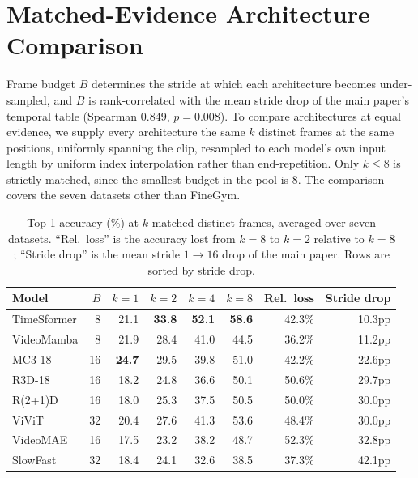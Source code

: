 \documentclass[a4paper, 10pt, conference, onecolumn]{ieeeconf}
\newcommand{\tabtight}{\setlength{\tabcolsep}{3.5pt}\renewcommand{\arraystretch}{1.12}}
\begin{document}
\section{Matched-Evidence Architecture Comparison}
\label{sec:sup_matched}

Frame budget $B$ determines the stride at which each architecture becomes
under-sampled, and $B$ is rank-correlated with the mean stride drop of the main
paper's temporal table (Spearman $0.849$, $p{=}0.008$). To compare architectures
at equal evidence, we supply every architecture the same $k$ distinct frames at
the same positions, uniformly spanning the clip, resampled to each model's own
input length by uniform index interpolation rather than end-repetition. Only
$k\leq8$ is strictly matched, since the smallest budget in the pool is 8. The
comparison covers the seven datasets other than FineGym.

\begin{table}[!htbp]
\centering
\caption{Top-1 accuracy (\%) at $k$ matched distinct frames, averaged over seven
datasets. ``Rel.\ loss'' is the accuracy lost from $k{=}8$ to $k{=}2$ relative
to $k{=}8$; ``Stride drop'' is the mean stride $1\to16$ drop of the main paper.
Rows are sorted by stride drop.}
\label{tab:sup_matched}
\scriptsize\tabtight
\begin{tabular}{l r rrrr r r}
\toprule
Model & $B$ & $k{=}1$ & $k{=}2$ & $k{=}4$ & $k{=}8$ & Rel.\ loss & Stride drop \\
\midrule
TimeSformer &  8 & 21.1 & \textbf{33.8} & \textbf{52.1} & \textbf{58.6} & 42.3\% & 10.3pp \\
VideoMamba  &  8 & 21.9 & 28.4 & 41.0 & 44.5 & 36.2\% & 11.2pp \\
MC3-18      & 16 & \textbf{24.7} & 29.5 & 39.8 & 51.0 & 42.2\% & 22.6pp \\
R3D-18      & 16 & 18.2 & 24.8 & 36.6 & 50.1 & 50.6\% & 29.7pp \\
R(2+1)D     & 16 & 18.0 & 25.3 & 37.5 & 50.5 & 50.0\% & 30.0pp \\
ViViT       & 32 & 20.4 & 27.6 & 41.3 & 53.6 & 48.4\% & 30.0pp \\
VideoMAE    & 16 & 17.5 & 23.2 & 38.2 & 48.7 & 52.3\% & 32.8pp \\
SlowFast    & 32 & 18.4 & 24.1 & 32.6 & 38.5 & 37.3\% & 42.1pp \\
\bottomrule
\end{tabular}
\end{table}
\end{document}
